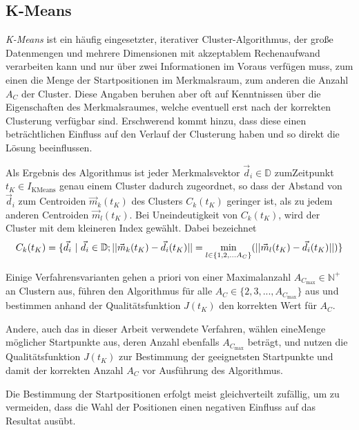 \subsection{K-Means}
  \textit{K-Means} ist ein häufig eingesetzter, iterativer Cluster-Algorithmus, der große Datenmengen und mehrere Dimensionen mit akzeptablem Rechenaufwand verarbeiten kann und nur über zwei Informationen im Voraus verfügen muss, zum einen die Menge der Startpositionen im Merkmalsraum, zum anderen die Anzahl $A_C$ der Cluster. Diese Angaben beruhen aber oft auf Kenntnissen über die Eigenschaften des Merkmalsraumes, welche eventuell erst nach der korrekten Clusterung verfügbar sind. Erschwerend kommt hinzu, dass diese einen beträchtlichen Einfluss auf den Verlauf der Clusterung haben und so direkt die Lösung beeinflussen. \cite{Yosung2005}

  Als Ergebnis des Algorithmus ist jeder Merkmalsvektor $\vec{d}_i\in\mathbb{D}$ zum\linebreak Zeitpunkt $t_K\in I_\textrm{KMeans}$ genau einem Cluster dadurch zugeordnet, so dass der Abstand von $\vec{d}_i$ zum Centroiden $\vec{m}_k(t_K)$ des Clusters $C_k(t_K)$ geringer ist, als zu jedem anderen Centroiden $\vec{m}_l(t_K)$. Bei Uneindeutigkeit von $C_k(t_K)$, wird der Cluster mit dem kleineren Index gewählt. Dabei bezeichnet 
  \begingroup
  \everymath{\scriptstyle}
  \small
  \begin{equation}\label{DefCluster}
    C_k(t_K) = \{\vec{d}_i \textrm{\space}\vert\textrm{\space} \vec{d}_i\in\mathbb{D}; ||\vec{m}_k(t_K) - \vec{d}_i(t_K)|| = \min\limits_{l\in \{1, 2, ... A_C\}}(||\vec{m}_l(t_K) - \vec{d}_i(t_K)||)\} 
  \end{equation}
  \endgroup

  \noindent Einige Verfahrensvarianten gehen a priori von einer Maximalanzahl $A_{C_\textrm{max}}\in\mathbb{N^+}$ an Clustern aus, führen den Algorithmus für alle $A_C\in\{2,3, ..., A_{C_\textrm{max}}\}$ aus und bestimmen anhand der Qualitätsfunktion $J(t_K)$ den korrekten Wert für $A_C$. \cite{Ray1999}
  
  Andere, auch das in dieser Arbeit verwendete Verfahren, wählen eine\linebreak Menge möglicher Startpunkte aus, deren Anzahl ebenfalls $A_{C_\textrm{max}}$ beträgt, und nutzen die Qualitätsfunktion $J(t_K)$ zur Bestimmung der geeignetsten Startpunkte und damit der korrekten Anzahl $A_C$ vor Ausführung des Algorithmus. \cite{Omran2005}

  Die Bestimmung der Startpositionen erfolgt meist gleichverteilt zufällig, um zu vermeiden, dass die Wahl der Positionen einen negativen Einfluss auf das Resultat ausübt. \cite{Omran2005}
  
